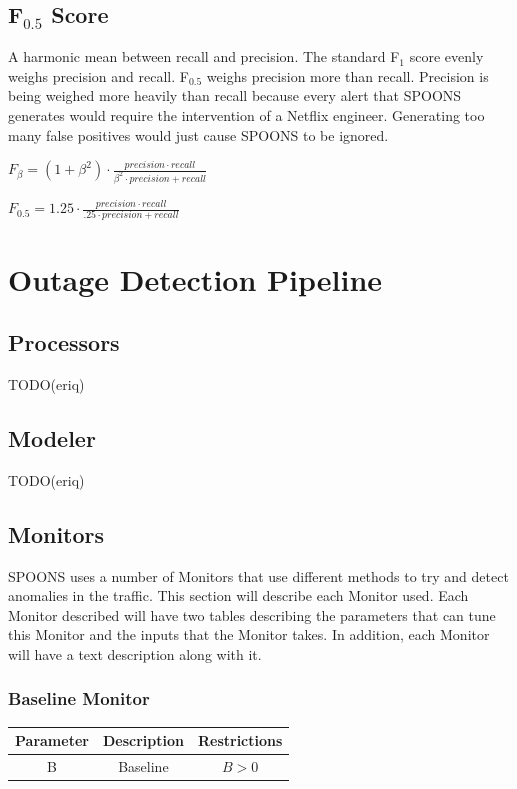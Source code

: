 \documentclass[12pt]{ucthesis}
\begin{document}
\subsection{F$_{0.5}$ Score}
A harmonic mean between recall and precision. The standard F$_{1}$ score evenly weighs precision and recall.
F$_{0.5}$ weighs precision more than recall. Precision is being weighed more heavily than recall because
every alert that SPOONS generates would require the intervention of a Netflix engineer. Generating too many
false positives would just cause SPOONS to be ignored.
\begin{center}
   $F_{\beta} = (1 + \beta^{2}) \cdot \frac{precision \cdot recall}{\beta^{2} \cdot precision + recall}$
\end{center}
\begin{center}
   $F_{0.5} = 1.25 \cdot \frac{precision \cdot recall}{.25 \cdot precision + recall}$
\end{center}

\section{Outage Detection Pipeline}
\label{outage-detection-pipeline}

\subsection{Processors}
\label{outage-detection-processors}
TODO(eriq)

\subsection{Modeler}
\label{outage-detection-modeler}
TODO(eriq)

\subsection{Monitors}
\label{outage-detection-monitors}
SPOONS uses a number of Monitors that use different methods to try and detect anomalies in the traffic.
This section will describe each Monitor used.
Each Monitor described will have two tables describing the parameters that can tune this Monitor and
the inputs that the Monitor takes. In addition, each Monitor will have a text description along with it.

\subsubsection{Baseline Monitor}
\label{outage-detection-monitors-Baseline}
\begin{table}[H]
   \begin{center}
      \begin{tabular}{|c|c|c|}
         \hline
            Parameter & Description & Restrictions \\
         \hline
            B & Baseline & $ B > 0 $\\
         \hline
      \end{tabular}
   \end{center}
\end{table}
\end{document}
